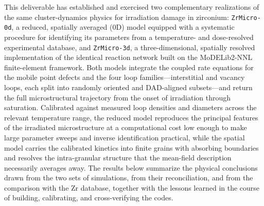 \documentclass{article}
\newcommand{\ZrM}{\texttt{ZrMicro-3d}}
\newcommand{\MoD}{\textsf{MoDELib2-NNL}}
\newcommand{\ZrOd}{\texttt{ZrMicro-0d}}
\begin{document}
This deliverable has established and exercised two complementary realizations of the same cluster-dynamics physics for irradiation damage in zirconium: {\ZrOd}, a reduced, spatially averaged (0D) model equipped with a systematic procedure for identifying its parameters from a temperature- and dose-resolved experimental database, and {\ZrM}, a three-dimensional, spatially resolved implementation of the identical reaction network built on the {\MoD} finite-element framework. Both models integrate the coupled rate equations for the mobile point defects and the four loop families---interstitial and vacancy loops, each split into randomly oriented and DAD-aligned subsets---and return the full microstructural trajectory from the onset of irradiation through saturation. Calibrated against measured loop densities and diameters across the relevant temperature range, the reduced model reproduces the principal features of the irradiated microstructure at a computational cost low enough to make large parameter sweeps and inverse identification practical, while the spatial model carries the calibrated kinetics into finite grains with absorbing boundaries and resolves the intra-granular structure that the mean-field description necessarily averages away. The results below summarize the physical conclusions drawn from the two sets of simulations, from their reconciliation, and from the comparison with the Zr database, together with the lessons learned in the course of building, calibrating, and cross-verifying the codes.
\end{document}
